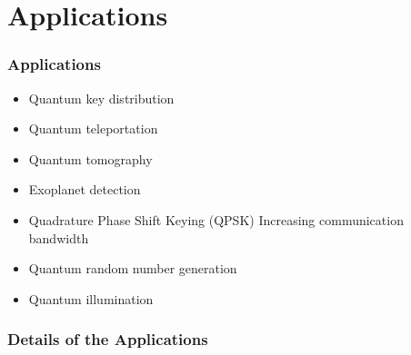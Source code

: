 \documentclass{beamer}
\begin{document}
% 
\section{Applications}
\begin{frame}
  \frametitle{Applications}
  \begin{itemize}
    \item Quantum key distribution
    \item Quantum teleportation
    \item Quantum tomography
    \item Exoplanet detection
    \item Quadrature Phase Shift Keying (QPSK)
          Increasing communication bandwidth
    \item Quantum random number generation
    \item Quantum illumination
  \end{itemize}
\end{frame}

\begin{frame}
  \frametitle{Details of the Applications}



\end{frame}
\end{document}
